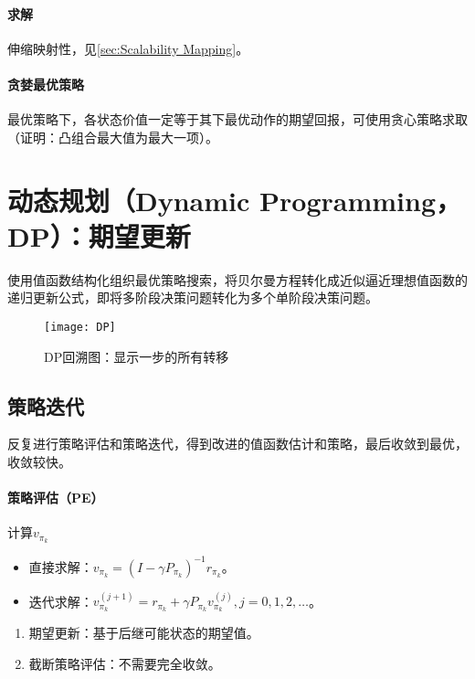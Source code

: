 \documentclass[
12pt, %
a4paper, 
oneside, %
headinclude,footinclude, %
]{scrartcl}
\begin{document}
\paragraph{求解}
伸缩映射性，见\ref{sec:Scalability Mapping}。\label{sec:Scalability Mapping back}
\paragraph{贪婪最优策略}
最优策略下，各状态价值一定等于其下最优动作的期望回报，可使用贪心策略求取（证明：凸组合最大值为最大一项）。
\section{动态规划（Dynamic Programming，DP）：期望更新}
\begin{minipage}{0.5\textwidth}
\hspace{2em}
使用值函数结构化组织最优策略搜索，将贝尔曼方程转化成近似逼近理想值函数的递归更新公式，即将多阶段决策问题转化为多个单阶段决策问题。
\end{minipage}
\hfill
\begin{minipage}{0.45\textwidth}
\begin{figure}[H]
\centering 
\texttt{[image: DP]} 
\caption[DP回溯图]{DP回溯图：显示一步的所有转移}
\end{figure}
\end{minipage}
\subsection{策略迭代}
反复进行策略评估和策略迭代，得到改进的值函数估计和策略，最后收敛到最优，收敛较快。
\paragraph{策略评估（PE）}
计算$ v_{\pi_k} $
\begin{itemize}
\item 直接求解：$ v_{\pi_k} = (I - \gamma P_{\pi_k})^{-1} r_{\pi_k} $。
\item 迭代求解：$ v_{\pi_k}^{(j + 1)} = r_{\pi_k} + \gamma P_{\pi_k} v_{\pi_k}^{(j)}, j = 0, 1, 2, \dots $。
\end{itemize}
\begin{enumerate}
\item 期望更新：基于后继可能状态的期望值。
\item 截断策略评估：不需要完全收敛。
\end{enumerate}
\end{document}

